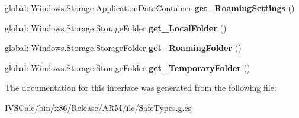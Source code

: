 \begin{DoxyCompactItemize}
global\+::\+Windows.\+Storage.\+Application\+Data\+Container {\bfseries get\+\_\+\+Roaming\+Settings} ()
\item 
\mbox{\label{interface_windows_1_1_storage_1_1_i_application_data_ae3fadf1db189f66f22c74d1ee0e4b1bc}} 
global\+::\+Windows.\+Storage.\+Storage\+Folder {\bfseries get\+\_\+\+Local\+Folder} ()
\item 
\mbox{\label{interface_windows_1_1_storage_1_1_i_application_data_a408ead99bd13a953bad06b2efaba4fb0}} 
global\+::\+Windows.\+Storage.\+Storage\+Folder {\bfseries get\+\_\+\+Roaming\+Folder} ()
\item 
\mbox{\label{interface_windows_1_1_storage_1_1_i_application_data_a7cc8d124ebf36fe0c0d96117a3e09ff2}} 
global\+::\+Windows.\+Storage.\+Storage\+Folder {\bfseries get\+\_\+\+Temporary\+Folder} ()
\end{DoxyCompactItemize}


The documentation for this interface was generated from the following file\+:\begin{DoxyCompactItemize}
\item 
I\+V\+S\+Calc/bin/x86/\+Release/\+A\+R\+M/ilc/Safe\+Types.\+g.\+cs\end{DoxyCompactItemize}

